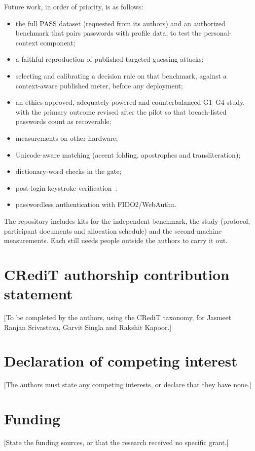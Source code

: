 \documentclass[preprint,12pt]{elsarticle}
\begin{document}
Future work, in order of priority, is as follows:
\begin{itemize}
\item the full PASS dataset (requested from its authors) and an authorized benchmark that pairs passwords with profile data, to test the personal-context component;
\item a faithful reproduction of published targeted-guessing attacks;
\item selecting and calibrating a decision rule on that benchmark, against a context-aware published meter, before any deployment;
\item an ethics-approved, adequately powered and counterbalanced G1--G4 study, with the primary outcome revised after the pilot so that breach-listed passwords count as recoverable;
\item measurements on other hardware;
\item Unicode-aware matching (accent folding, apostrophes and transliteration);
\item dictionary-word checks in the gate;
\item post-login keystroke verification~\cite{parkinson,rusli};
\item passwordless authentication with FIDO2/WebAuthn.
\end{itemize}
The repository includes kits for the independent benchmark, the study (protocol, participant documents and allocation schedule) and the second-machine measurements. Each still needs people outside the authors to carry it out.


\section*{CRediT authorship contribution statement}
[To be completed by the authors, using the CRediT taxonomy, for Jasmeet Ranjan Srivastava, Garvit Singla and Rakshit Kapoor.]

\section*{Declaration of competing interest}
[The authors must state any competing interests, or declare that they have none.]

\section*{Funding}
[State the funding sources, or that the research received no specific grant.]
\end{document}
